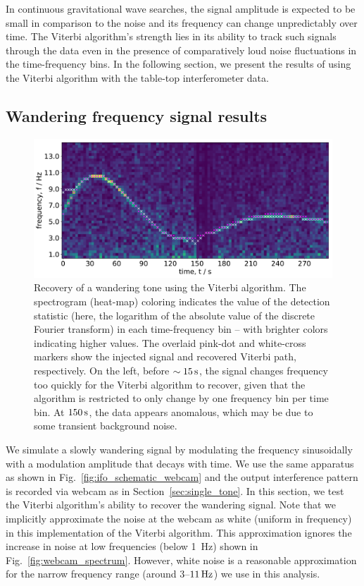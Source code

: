 \documentclass[paper-main.tex]{subfiles}
\begin{document}
In continuous gravitational wave searches, the signal amplitude is expected to be small in comparison to the noise and its frequency can change unpredictably over time. 
The Viterbi algorithm's strength lies in its ability to track such signals through the data even in the presence of comparatively loud noise fluctuations in the time-frequency bins.
In the following section, we present the results of using the Viterbi algorithm with the table-top interferometer data. 


\subsection{Wandering frequency signal results}
\label{sec:wanderingResults}

\begin{figure}
	\includegraphics[width=\textwidth]{figures/expt_overlay_2_viterbi_test_webcam.pdf}
	\caption{\label{fig:viterbi_overlay}
Recovery of a wandering tone using the Viterbi algorithm.
The spectrogram (heat-map) coloring indicates the value of the detection statistic (here, the logarithm of the absolute value of the discrete Fourier transform) in each time-frequency bin -- with brighter colors indicating higher values. 
The overlaid pink-dot and white-cross markers show the injected signal and recovered Viterbi path, respectively. 
On the left, before $\sim 15\,{\rm s}$, the signal changes frequency too quickly for the Viterbi algorithm to recover, given that the algorithm is restricted to only change by one frequency bin per time bin. 
At $150\,{\rm s}$, the data appears anomalous, which may be due to some transient background noise. }
\end{figure}
 

We simulate a slowly wandering signal by modulating the frequency sinusoidally with a modulation amplitude that decays with time. 
We use the same apparatus as shown in Fig.~\ref{fig:ifo_schematic_webcam} and the output interference pattern is recorded via webcam as in Section~\ref{sec:single_tone}. 
In this section, we test the Viterbi algorithm’s ability to recover the wandering signal. 
Note that we implicitly approximate the noise at the webcam as white (uniform in frequency) in this implementation of the Viterbi algorithm. 
This approximation ignores the increase in noise at low frequencies (below 1~Hz) shown in Fig.~\ref{fig:webcam_spectrum}.
However, white noise is a reasonable approximation for the narrow frequency range (around $3$--$11\,{\rm Hz}$) we use in this analysis. 
\end{document}
